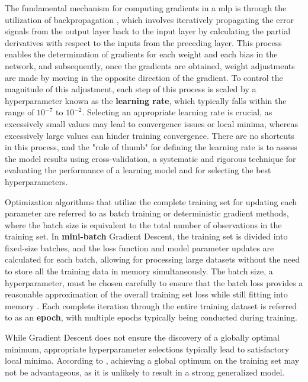The fundamental mechanism for computing gradients in a \gls{mlp} is through the utilization of backpropagation \cite{Rumelhart1986}, which involves iteratively propagating the error signals from the output layer back to the input layer by calculating the partial derivatives with respect to the inputs from the preceding layer. This process enables the determination of gradients for each weight and each bias in the network, and subsequently, once the gradients are obtained, weight adjustments are made by moving in the opposite direction of the gradient. To control the magnitude of this adjustment, each step of this process is scaled by a hyperparameter known as the \textbf{learning rate}, which typically falls within the range of $10^{-7}$ to $10^{-2}$. Selecting an appropriate learning rate is crucial, as excessively small values may lead to convergence issues or local minima, whereas excessively large values can hinder training convergence. There are no shortcuts in this process, and the "rule of thumb" for defining the learning rate is to assess the model results using cross-validation, a systematic and rigorous technique for evaluating the performance of a learning model and for selecting the best hyperparameters.

Optimization algorithms that utilize the complete training set for updating each parameter are referred to as batch training or deterministic gradient methods, where the batch size is equivalent to the total number of observations in the training set. In \textbf{mini-batch} Gradient Descent, the training set is divided into fixed-size batches, and the loss function and model parameter updates are calculated for each batch, allowing for processing large datasets without the need to store all the training data in memory simultaneously. The batch size, a hyperparameter, must be chosen carefully to ensure that the batch loss provides a reasonable approximation of the overall training set loss while still fitting into memory \cite{Bishop2023}. Each complete iteration through the entire training dataset is referred to as an \textbf{epoch}, with multiple epochs typically being conducted during training. 

While Gradient Descent does not ensure the discovery of a globally optimal minimum, appropriate hyperparameter selections typically lead to satisfactory local minima. According to \textcite{Choromanska2015}, achieving a global optimum on the training set may not be advantageous, as it is unlikely to result in a strong generalized model.


